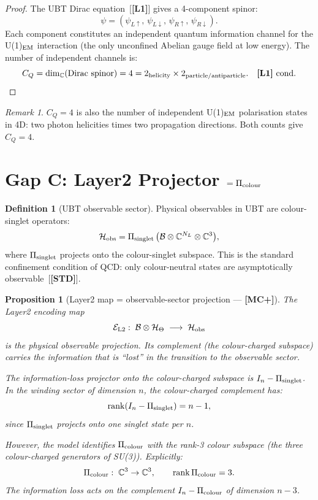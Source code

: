 \documentclass[12pt,a4paper]{article}
\newtheorem{proposition}[theorem]{Proposition}
\theoremstyle{definition}\newtheorem{definition}[theorem]{Definition}
\theoremstyle{remark}\newtheorem{remark}[theorem]{Remark}
\newcommand{\Lo}{\textbf{[L1]}}
\newcommand{\MCp}{\textbf{[MC+]}}
\newcommand{\STD}{\textbf{[STD]}}
\newcommand{\CC}{\mathbb{C}}
\newcommand{\BB}{\mathcal{B}}
\begin{document}
\begin{proof}
The UBT Dirac equation~[\Lo] gives a 4-component spinor:
\[
  \psi = (\psi_{L\uparrow},\, \psi_{L\downarrow},\,
          \psi_{R\uparrow},\, \psi_{R\downarrow}).
\]
Each component constitutes an independent quantum information channel
for the U(1)$_{\rm EM}$ interaction (the only unconfined Abelian
gauge field at low energy). The number of independent channels is:
\[
  C_Q = \dim_\CC(\text{Dirac spinor}) = 4
  = 2_{\rm helicity} \times 2_{\rm particle/antiparticle}. \quad \Lo\ \text{cond.}
\]
\end{proof}

\begin{remark}
$C_Q = 4$ is also the number of independent U(1)$_{\rm EM}$
polarisation states in 4D: two photon helicities times two
propagation directions. Both counts give $C_Q = 4$.
\end{remark}

\section{Gap C: Layer2 Projector $= \Pi_{\rm colour}$}
\label{sec:gap_C}

\begin{definition}[UBT observable sector]
\label{def:obs}
Physical observables in UBT are colour-singlet operators:
\[
  \mathcal{H}_{\rm obs}
  = \Pi_{\rm singlet}\,
    \bigl(\BB \otimes \CC^{N_L} \otimes \CC^3\bigr),
\]
where $\Pi_{\rm singlet}$ projects onto the colour-singlet subspace.
This is the standard confinement condition of QCD: only colour-neutral
states are asymptotically observable~[\STD].
\end{definition}

\begin{proposition}[Layer2 map = observable-sector projection — \MCp]
\label{prop:L2map}
The Layer2 encoding map
\[
  \mathcal{E}_{\rm L2}:\;
  \BB \otimes \mathcal{H}_\Theta
  \;\longrightarrow\;
  \mathcal{H}_{\rm obs}
\]
is the physical observable projection. Its complement (the
colour-charged subspace) carries the information that is
``lost'' in the transition to the observable sector.

The information-loss projector onto the colour-charged subspace
is $I_n - \Pi_{\rm singlet}$. In the winding sector of dimension
$n$, the colour-charged complement has:
\[
  \mathrm{rank}(I_n - \Pi_{\rm singlet})
  = n - 1,
\]
since $\Pi_{\rm singlet}$ projects onto one singlet state per $n$.

However, the model identifies $\Pi_{\rm colour}$ with the
rank-3 colour subspace (the three colour-charged generators of
SU(3)). Explicitly:
\[
  \Pi_{\rm colour}:\;
  \CC^3 \to \CC^3,
  \qquad
  \mathrm{rank}\,\Pi_{\rm colour} = 3.
\]
The information loss acts on the complement
$I_n - \Pi_{\rm colour}$ of dimension $n - 3$.
\end{proposition}
\end{document}
